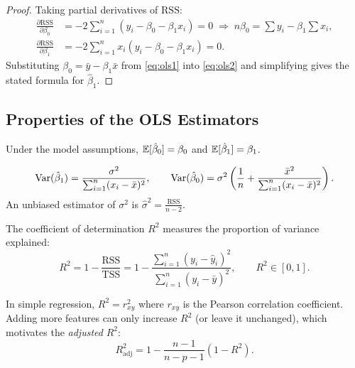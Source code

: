 \begin{proof}
Taking partial derivatives of $\text{RSS}$:
\begin{align}
    \frac{\partial \text{RSS}}{\partial \beta_0}
    &= -2 \sum_{i=1}^{n}(y_i - \beta_0 - \beta_1 x_i) = 0
    \;\Longrightarrow\;
    n\beta_0 = \sum y_i - \beta_1 \sum x_i, \label{eq:ols1}\\
    \frac{\partial \text{RSS}}{\partial \beta_1}
    &= -2 \sum_{i=1}^{n} x_i(y_i - \beta_0 - \beta_1 x_i) = 0. \label{eq:ols2}
\end{align}
Substituting $\beta_0 = \bar{y} - \beta_1 \bar{x}$ from \eqref{eq:ols1} into \eqref{eq:ols2} and simplifying gives the stated formula for $\hat{\beta}_1$.
\end{proof}

\subsection{Properties of the OLS Estimators}

\begin{proposition}[Unbiasedness]
Under the model assumptions, $\mathbb{E}[\hat{\beta}_0] = \beta_0$ and $\mathbb{E}[\hat{\beta}_1] = \beta_1$.
\end{proposition}

\begin{proposition}
\[
    \mathrm{Var}(\hat{\beta}_1) = \frac{\sigma^2}{\sum_{i=1}^{n}(x_i - \bar{x})^2},
    \qquad
    \mathrm{Var}(\hat{\beta}_0) = \sigma^2\left(\frac{1}{n} + \frac{\bar{x}^2}{\sum_{i=1}^{n}(x_i-\bar{x})^2}\right).
\]
An unbiased estimator of $\sigma^2$ is $\hat{\sigma}^2 = \frac{\text{RSS}}{n-2}$.
\end{proposition}

\begin{definition}
The coefficient of determination $R^2$ measures the proportion of variance explained:
\[
    R^2 = 1 - \frac{\text{RSS}}{\text{TSS}}
    = 1 - \frac{\sum_{i=1}^{n}(y_i - \hat{y}_i)^2}{\sum_{i=1}^{n}(y_i - \bar{y})^2},
    \qquad R^2 \in [0,1].
\]
\end{definition}

\begin{remark}
In simple regression, $R^2 = r_{xy}^2$ where $r_{xy}$ is the Pearson correlation coefficient. Adding more features can only increase $R^2$ (or leave it unchanged), which motivates the \emph{adjusted} $R^2$:
\[
    R^2_{\text{adj}} = 1 - \frac{n-1}{n-p-1}(1-R^2).
\]
\end{remark}

